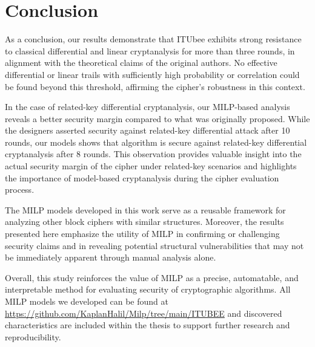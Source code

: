 \section{Conclusion}
As a conclusion, our results demonstrate that ITUbee exhibits strong resistance to classical differential and linear cryptanalysis for more than three rounds, in alignment with the theoretical claims of the original authors. No effective differential or linear trails with sufficiently high probability or correlation could be found beyond this threshold, affirming the cipher’s robustness in this context.

In the case of related-key differential cryptanalysis, our MILP-based analysis reveals a better security margin compared to what was originally proposed. While the designers asserted security against related-key differential attack after 10 rounds, our models shows that algorithm is secure against related-key differential cryptanalysis after 8 rounds. This observation provides valuable insight into the actual security margin of the cipher under related-key scenarios and highlights the importance of model-based cryptanalysis during the cipher evaluation process.

The MILP models developed in this work serve as a reusable framework for analyzing other block ciphers with similar structures. Moreover, the results presented here emphasize the utility of MILP in confirming or challenging security claims and in revealing potential structural vulnerabilities that may not be immediately apparent through manual analysis alone.

Overall, this study reinforces the value of MILP as a precise, automatable, and interpretable method for evaluating security of  cryptographic algorithms. All MILP models we developed can be found at \url{https://github.com/KaplanHalil/Milp/tree/main/ITUBEE} and discovered characteristics are included within the thesis  to support further research and reproducibility.